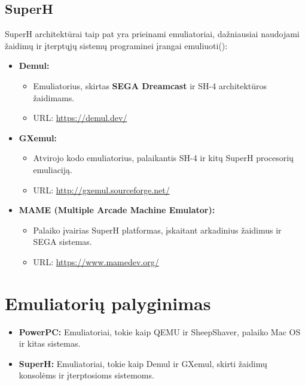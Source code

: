 \documentclass{article}
\begin{document}
\subsection{SuperH}
SuperH architektūrai taip pat yra prieinami emuliatoriai, dažniausiai naudojami žaidimų ir įterptųjų sistemų programinei įrangai emuliuoti(\citealp{ChatGPT2024}):

\begin{itemize}
    \item \textbf{Demul:}
        \begin{itemize}
            \item Emuliatorius, skirtas \textbf{SEGA Dreamcast} ir SH-4 architektūros žaidimams.
            \item URL: \url{https://demul.dev/}
        \end{itemize}
    \item \textbf{GXemul:}
        \begin{itemize}
            \item Atvirojo kodo emuliatorius, palaikantis SH-4 ir kitų SuperH procesorių emuliaciją.
            \item URL: \url{http://gxemul.sourceforge.net/}
        \end{itemize}
    \item \textbf{MAME (Multiple Arcade Machine Emulator):}
        \begin{itemize}
            \item Palaiko įvairias SuperH platformas, įskaitant arkadinius žaidimus ir SEGA sistemas.
            \item URL: \url{https://www.mamedev.org/}
        \end{itemize}
\end{itemize}

\section*{Emuliatorių palyginimas}
\begin{itemize}
    \item \textbf{PowerPC:} Emuliatoriai, tokie kaip QEMU ir SheepShaver, palaiko Mac OS ir kitas sistemas.
    \item \textbf{SuperH:} Emuliatoriai, tokie kaip Demul ir GXemul, skirti žaidimų konsolėms ir įterptosioms sistemoms.
\end{itemize}



\end{document}

